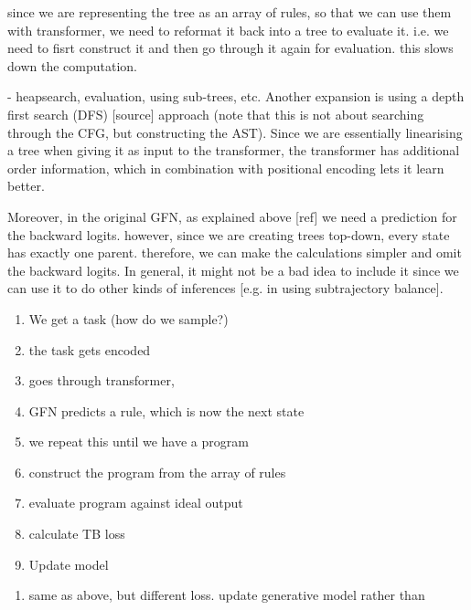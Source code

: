 since we are representing the tree as an array of rules, so that we can use them with transformer, we need to reformat it back into a tree to evaluate it. i.e. we need to fisrt construct it and then go through it again for evaluation. this slows down the computation. 


- heapsearch, evaluation, using sub-trees, etc. 
Another expansion is using a depth first search (DFS) [source] approach (note that this is not about searching through the CFG, but constructing the AST). Since we are essentially linearising a tree when giving it as input to the transformer, the transformer has additional order information, which in combination with positional encoding lets it learn better. 

Moreover, in the original GFN, as explained above [ref] we need a prediction for the backward logits. however, since we are creating trees top-down, every state has exactly one parent. therefore, we can make the calculations simpler and omit the backward logits. 
In general, it might not be a bad idea to include it since we can use it to do other kinds of inferences [e.g. in using subtrajectory balance].















\begin{enumerate}
    \item We get a task (how do we sample?)
    \item the task gets encoded
    \item goes through transformer, 
    \item GFN predicts a rule, which is now the next state
    \item we repeat this until we have a program
    \item construct the program from the array of rules
    \item evaluate program against ideal output
    \item calculate TB loss
    \item Update model
\end{enumerate}
\begin{enumerate}
    \item same as above, but different loss. update generative model rather than 
\end{enumerate}


